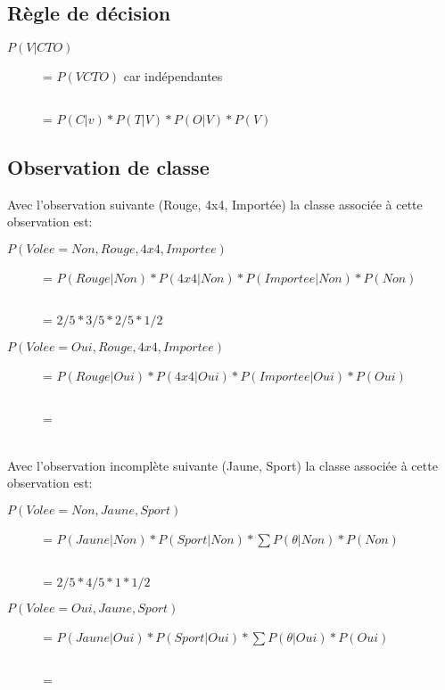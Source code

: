 \subsection{Règle de décision}
\begin{description}
\item[$P(V|CTO)$] = $P(VCTO)$ car indépendantes
\item[$        $] = $P(C|v)*P(T|V)*P(O|V)*P(V)$
\end{description}

\subsection{Observation de classe}
Avec l'observation suivante (Rouge, 4x4, Importée) la classe associée à cette observation est:
\begin{description}
\item[$P(Volee=Non,Rouge,4x4,Importee)$] = $P(Rouge|Non)*P(4x4|Non)*P(Importee|Non)*P(Non)$
\item[$                               $] = $2/5 * 3/5 * 2/5 * 1/2$
\end{description}
\begin{description}
\item[$P(Volee=Oui,Rouge,4x4,Importee)$] = $P(Rouge|Oui)*P(4x4|Oui)*P(Importee|Oui)*P(Oui)$
\item[$                               $] = $ $
\end{description}

\ \\
Avec l'observation incomplète suivante (Jaune, Sport) la classe associée à cette observation est:
\begin{description}
\item[$P(Volee=Non,Jaune,Sport)$] = $P(Jaune|Non)*P(Sport|Non)* \sum P(\theta|Non)*P(Non)$
\item[$                               $] = $2/5 * 4/5 * 1 * 1/2$
\end{description}
\begin{description}
\item[$P(Volee=Oui,Jaune,Sport)$] = $P(Jaune|Oui)*P(Sport|Oui)*\sum P(\theta|Oui)*P(Oui)$
\item[$                               $] = $ $
\end{description}
\pagebreak